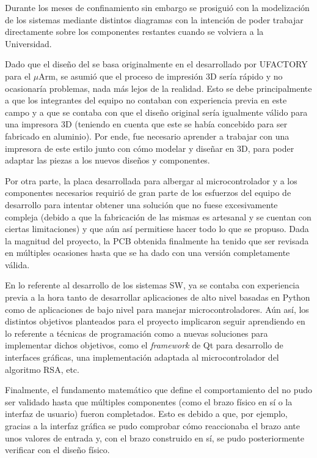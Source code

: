 Durante los meses de confinamiento sin embargo se prosiguió con la modelización
de los sistemas mediante distintos diagramas con la intención de poder trabajar
directamente sobre los componentes restantes cuando se volviera a la Universidad.

Dado que el diseño del \pArm{} se basa originalmente en el desarrollado por UFACTORY
para el $\mu$Arm, se asumió que el proceso de impresión 3D sería rápido y no
ocasionaría problemas, nada más lejos de la realidad. Esto se debe principalmente
a que los integrantes del equipo no contaban con experiencia previa en este campo y
a que se contaba con que el diseño original sería igualmente válido para una impresora
3D (teniendo en cuenta que este se había concebido para ser fabricado en aluminio).
Por ende, fue necesario aprender a trabajar con una impresora de este estilo
junto con cómo modelar y diseñar en 3D, para poder adaptar las piezas a los nuevos
diseños y componentes.

Por otra parte, la placa desarrollada para albergar al microcontrolador y a los
componentes necesarios requirió de gran parte de los esfuerzos del equipo de
desarrollo para intentar obtener una solución que no fuese excesivamente compleja
(debido a que la fabricación de las mismas es artesanal y se cuentan con ciertas
limitaciones) y que aún así permitiese hacer todo lo que se propuso. Dada la magnitud
del proyecto, la \ac{PCB} obtenida finalmente ha tenido que ser revisada en múltiples
ocasiones hasta que se ha dado con una versión completamente válida.

En lo referente al desarrollo de los sistemas \ac{SW}, ya se contaba con experiencia
previa a la hora tanto de desarrollar aplicaciones de alto nivel basadas en Python
como de aplicaciones de bajo nivel para manejar microcontroladores. Aún así, los distintos
objetivos planteados para el proyecto implicaron seguir aprendiendo en lo referente a
técnicas de programación como a nuevas soluciones para implementar dichos objetivos,
como el \textit{framework} de Qt para desarrollo de interfaces gráficas, una implementación
adaptada al microcontrolador del algoritmo RSA, etc.

Finalmente, el fundamento matemático que define el comportamiento del \pArm{} no pudo
ser validado hasta que múltiples componentes (como el brazo físico en sí o la
interfaz de usuario) fueron completados. Esto es debido a que, por ejemplo,
gracias a la interfaz gráfica se pudo comprobar cómo reaccionaba el brazo ante
unos valores de entrada y, con el brazo construido en sí, se pudo posteriormente
verificar con el diseño físico.

